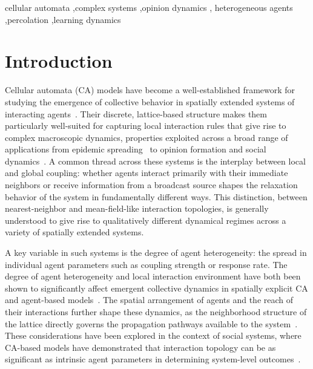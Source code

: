 \documentclass[a4paper,fleqn]{cas-sc}
\begin{document}
\begin{keywords}
cellular automata \sep complex systems \sep opinion dynamics \sep 
heterogeneous agents \sep percolation \sep learning dynamics
\end{keywords}

\maketitle

\section{Introduction}\label{sec:intro}

Cellular automata (CA) models have become a well-established framework for studying the emergence of collective behavior in spatially extended systems of interacting agents~\citep{kari2005catheory, zaitsev2017generalized, louis2018probabilistic, Batac2009, arciaga2009experimental}.
Their discrete, lattice-based structure makes them particularly well-suited for capturing local interaction rules that give rise to complex macroscopic dynamics, properties exploited across a broad range of applications from epidemic spreading~\citep{Beauchemin2005} to opinion formation and social dynamics~\citep{castellano2009statistical}.
A common thread across these systems is the interplay between local and global coupling: whether agents interact primarily with their immediate neighbors or receive information from a broadcast source shapes the relaxation behavior of the system in fundamentally different ways.
This distinction, between nearest-neighbor and mean-field-like interaction topologies, is generally understood to give rise to qualitatively different dynamical regimes across a variety of spatially extended systems.

A key variable in such systems is the degree of agent heterogeneity: the spread in individual agent parameters such as coupling strength or response rate.
The degree of agent heterogeneity and local interaction environment have both been shown to significantly affect emergent collective dynamics in spatially explicit CA and agent-based models~\citep{lopez2014addressing, brown2006effects, jiao2011emergent}.
The spatial arrangement of agents and the reach of their interactions further shape these dynamics, as the neighborhood structure of the lattice directly governs the propagation pathways available to the system~\citep{dong2021influence, kari2005catheory}.
These considerations have been explored in the context of social systems, where CA-based models have demonstrated that interaction topology can be as significant as intrinsic agent parameters in determining system-level outcomes~\citep{bordogna2001theoretical, bordogna2003simulation, castellano2009statistical}.
\end{document}

